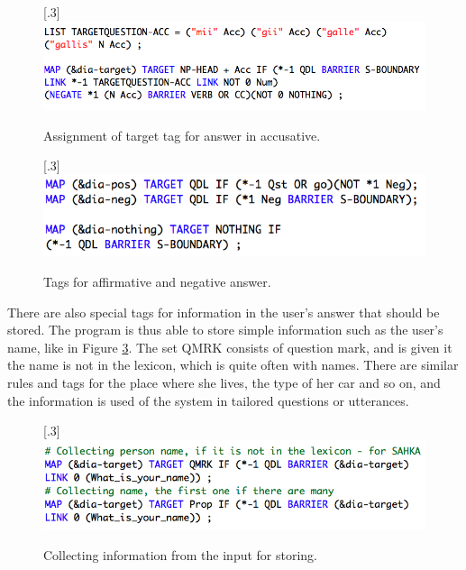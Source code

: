 \documentclass[11pt]{article}
\begin{document}
\begin{figure}[htbp]
\begin{center}
\scalebox{.3}[.3]{\includegraphics{presentation/img/target_acc.png}}\\
\caption{Assignment of target tag for answer in accusative. 
}
\label{targettag}
\end{center}
\end{figure}

\begin{figure}[htbp]
\begin{center}
\scalebox{.3}[.3]{\includegraphics{presentation/img/aff_or_neg_colours.png}}\\
\caption{Tags for affirmative and negative answer. 
}
\label{afforneg}
\end{center}
\end{figure}


There are also special tags for information in the user's answer that should be stored. The program is thus able to store simple information such as the user's name, like in Figure \ref{nametag}. The set QMRK consists of question mark, and is given it the name is not in the lexicon, which is quite often with names. There are similar rules and tags for the place where she lives, the type of her car and so on, and the information is used of the system in tailored questions or utterances.

\begin{figure}[htbp]
\begin{center}
\scalebox{.3}[.3]{\includegraphics{presentation/img/picking_name_new.png}}\\
\caption{Collecting information from the input for storing.}
\label{nametag}
\end{center}
\end{figure}
\end{document}
